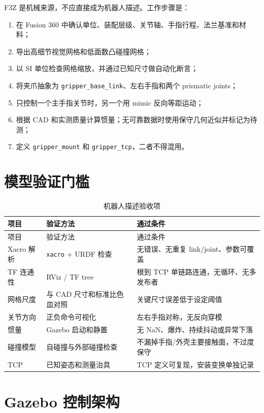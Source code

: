 \documentclass[UTF8,12pt,oneside]{ctexrep}
\begin{document}
F3Z 是机械来源，不应直接成为机器人描述。工作步骤是：

\begin{enumerate}
  \item 在 Fusion 360 中确认单位、装配层级、关节轴、手指行程、法兰基准和材料；
  \item 导出高细节视觉网格和低面数凸碰撞网格；
  \item 以 SI 单位检查网格缩放，并通过已知尺寸做自动化断言；
  \item 将夹爪抽象为 \texttt{gripper\_base\_link}、左右手指和两个 prismatic joints；
  \item 只控制一个主手指关节时，另一个用 mimic 反向等距运动；
  \item 根据 CAD 和实测质量计算惯量；无可靠数据时使用保守几何近似并标记为待测；
  \item 定义 \texttt{gripper\_mount} 和 \texttt{gripper\_tcp}，二者不得混用。
\end{enumerate}

\section{模型验证门槛}

\begin{longtable}{L{3cm}L{5.5cm}L{6cm}}
\caption{机器人描述验收项}\\
\toprule
项目 & 验证方法 & 通过条件 \\
\midrule
\endfirsthead
\toprule
项目 & 验证方法 & 通过条件 \\
\midrule
\endhead
Xacro 解析 & \texttt{xacro} + URDF 检查 & 无错误、无重复 link/joint、参数可覆盖 \\
TF 连通性 & RViz / TF tree & 根到 TCP 单链路连通，无循环、无多发布者 \\
网格尺度 & 与 CAD 尺寸和标准比色皿对照 & 关键尺寸误差低于设定阈值 \\
关节方向 & 正负命令可视化 & 左右手指对称，无反向穿模 \\
惯量 & Gazebo 启动和静置 & 无 NaN、爆炸、持续抖动或异常下落 \\
碰撞模型 & 自碰撞与外部碰撞检查 & 不漏掉手指/外壳主要接触面，不过度保守 \\
TCP & 已知姿态和测量治具 & TCP 定义可复现，安装变换单独记录 \\
\bottomrule
\end{longtable}

\section{Gazebo 控制架构}
\end{document}
